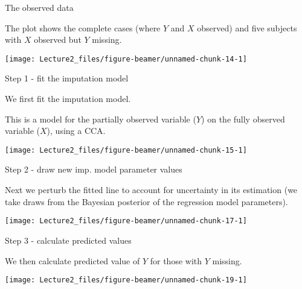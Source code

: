 \documentclass[ignorenonframetext,]{beamer}
\begin{document}
\begin{frame}{The observed data}
\protect\hypertarget{the-observed-data}{}

The plot shows the complete cases (where \(Y\) and \(X\) observed) and
five subjects with \(X\) observed but \(Y\) missing.

\begin{center}\texttt{[image: Lecture2\_files/figure-beamer/unnamed-chunk-14-1]} \end{center}

\end{frame}

\begin{frame}{Step 1 - fit the imputation model}
\protect\hypertarget{step-1---fit-the-imputation-model}{}

We first fit the imputation model.

This is a model for the partially observed variable (\(Y\)) on the fully
observed variable (\(X\)), using a CCA.

\begin{center}\texttt{[image: Lecture2\_files/figure-beamer/unnamed-chunk-15-1]} \end{center}

\end{frame}

\begin{frame}{Step 2 - draw new imp. model parameter values}
\protect\hypertarget{step-2---draw-new-imp.-model-parameter-values}{}

Next we perturb the fitted line to account for uncertainty in its
estimation (we take draws from the Bayesian posterior of the regression
model parameters).

\begin{center}\texttt{[image: Lecture2\_files/figure-beamer/unnamed-chunk-17-1]} \end{center}

\end{frame}

\begin{frame}{Step 3 - calculate predicted values}
\protect\hypertarget{step-3---calculate-predicted-values}{}

We then calculate predicted value of \(Y\) for those with \(Y\) missing.

\begin{center}\texttt{[image: Lecture2\_files/figure-beamer/unnamed-chunk-19-1]} \end{center}

\end{frame}
\end{document}
